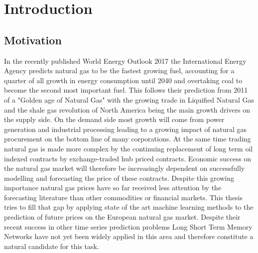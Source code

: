 \section{Introduction}
\subsection{Motivation}
In the recently published World Energy Outlook 2017 the International Energy Agency predicts natural gas to be the fastest growing fuel, accounting for a quarter of all growth in energy consumption until 2040 and overtaking coal to become the second most important fuel. This follows their prediction from 2011 of a "Golden age of Natural Gas" with the growing trade in Liquified Natural Gas and the shale gas revolution of North America being the main growth drivers on the supply side. On the demand side most growth will come from power generation and industrial processing leading to a growing impact of natural gas procurement on the bottom line of many corporations.  At the same time trading natural gas is made more complex by the continuing replacement of long term oil indexed contracts by exchange-traded hub priced contracts. Economic success on the natural gas market will therefore be increasingly dependent on successfully modelling and forecasting the price of these contracts. Despite this growing importance natural gas prices have so far received less attention by the forecasting literature than other commodities or financial markets. This thesis tries to fill that gap by applying state of the art machine learning methods to the prediction of future prices on the European natural gas market. Despite their recent success in other time series prediction problems Long Short Term Memory Networks have not yet been widely applied in this area and therefore constitute a natural candidate for this task. 
